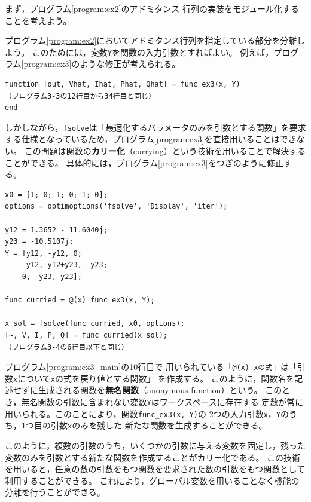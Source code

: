\documentclass[tombow,dvipdfmx]{corona-a5-1.1}
\begin{document}
まず，プログラム\nobreak\ref{program:ex2}のアドミタンス
行列の実装をモジュール化することを考えよう。

\begin{例}[アドミタンス行列の実装の分離]
プログラム\nobreak\ref{program:ex2}においてアドミタンス行列を指定している部分を分離しよう。
このためには，変数\verb|Y|を関数の入力引数とすればよい。
例えば，プログラム\nobreak\ref{program:ex3}のような修正が考えられる。

\smallskip
\begin{PROGRAMA}[count, title={func\_ex3.m}]\label{program:ex3}
\begin{verbatim}
function [out, Vhat, Ihat, Phat, Qhat] = func_ex3(x, Y)
（プログラム3-3の12行目から34行目と同じ）
end
\end{verbatim}
\end{PROGRAMA}

しかしながら，\verb|fsolve|は「最適化するパラメータのみを引数とする関数」を要求する仕様となっているため，プログラム\ref{program:ex3}を直接用いることはできない。
この問題は関数の\textbf{カリー化}（currying）という技術を用いることで解決することができる。
具体的には，プログラム\ref{program:ex3}をつぎのように修正する。


\smallskip
\begin{PROGRAMA}[count,title={main\_ex3.m}]\label{program:ex3_main}
\begin{verbatim}
x0 = [1; 0; 1; 0; 1; 0];
options = optimoptions('fsolve', 'Display', 'iter');

y12 = 1.3652 - 11.6040j;
y23 = -10.5107j;
Y = [y12, -y12, 0;
    -y12, y12+y23, -y23;
    0, -y23, y23];

func_curried = @(x) func_ex3(x, Y);

x_sol = fsolve(func_curried, x0, options);
[~, V, I, P, Q] = func_curried(x_sol);
（プログラム3-4の6行目以下と同じ）
\end{verbatim}
\end{PROGRAMA}

プログラム\nobreak\ref{program:ex3_main}の10行目で
用いられている「\verb|@(x) xの式|」は「引数\verb|x|について\verb|x|の式を戻り値とする関数」
を作成する。
このように，関数名を記述せずに生成される関数を\textbf{無名関数}（anonymous function）という。
このとき，無名関数の引数に含まれない変数\verb|Y|はワークスペースに存在する
定数が常に用いられる。このことにより，関数\verb|func_ex3(x, Y)|の
2つの入力引数\verb|x|，\verb|Y|のうち，1つ目の引数\verb|x|のみを残した
新たな関数を生成することができる。

このように，複数の引数のうち，いくつかの引数に与える変数を固定し，残った変数のみを引数とする新たな関数を作成することがカリー化である。
この技術を用いると，任意の数の引数をもつ関数を要求された数の引数をもつ関数として利用することができる。
これにより，グローバル変数を用いることなく機能の分離を行うことができる。

\end{例}
\end{document}
